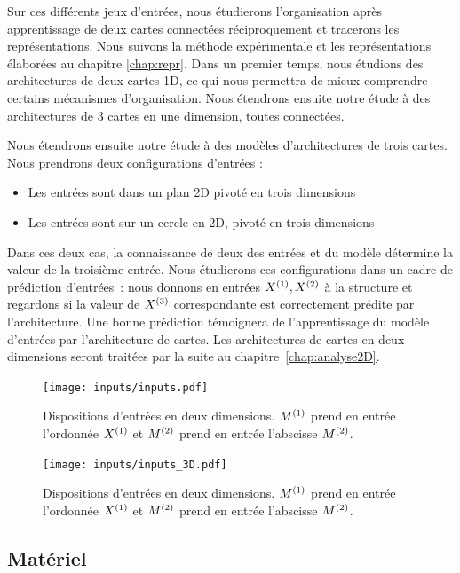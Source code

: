 \documentclass[../main]{subfiles}
\begin{document}
Sur ces différents jeux d'entrées, nous étudierons l'organisation après apprentissage de deux cartes connectées réciproquement et tracerons les représentations. Nous suivons la méthode expérimentale et les représentations élaborées au chapitre \ref{chap:repr}.
Dans un premier temps, nous étudions des architectures de deux cartes 1D, ce qui nous permettra de mieux comprendre certains mécanismes d'organisation.
Nous étendrons ensuite notre étude à des architectures de 3 cartes en une dimension, toutes connectées.

Nous étendrons ensuite notre étude à des modèles d'architectures de trois cartes. Nous prendrons deux configurations d'entrées : 
\begin{itemize}
	\item Les entrées sont dans un plan 2D pivoté en trois dimensions
	\item Les entrées sont sur un cercle en 2D, pivoté en trois dimensions
\end{itemize}

Dans ces deux cas, la connaissance de deux des entrées et du modèle détermine la valeur de la troisième entrée. Nous étudierons ces configurations dans un cadre de prédiction d'entrées~: nous donnons en entrées $X^{({1})}, X^{({2})}$ à la structure et regardons si la valeur de $X^{({3})}$ correspondante est correctement prédite par l'architecture. Une bonne prédiction témoignera de l'apprentissage du modèle d'entrées par l'architecture de cartes.
Les architectures de cartes en deux dimensions seront traitées par la suite au chapitre~\ref{chap:analyse2D}.

\begin{figure}
	\texttt{[image: inputs/inputs.pdf]}
	\caption{Dispositions d'entrées en deux dimensions. $M^{({1})}$ prend en entrée l'ordonnée $X^{({1})}$ et $M^{({2})}$ prend en entrée l'abscisse $M^{({2})}$. \label{fig:input_list}}
\end{figure}

\begin{figure}
	\texttt{[image: inputs/inputs\_3D.pdf]}
	\caption{Dispositions d'entrées en deux dimensions. $M^{({1})}$ prend en entrée l'ordonnée $X^{({1})}$ et $M^{({2})}$ prend en entrée l'abscisse $M^{({2})}$. \label{fig:input_list}}
\end{figure}


\subsection{Matériel}
\end{document}
